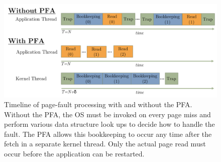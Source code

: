 \begin{figure}[h]
    \centering
    \includegraphics[width=\columnwidth]{figs/bookkeeping_timeline.pdf}
    \caption{Timeline of page-fault processing with and without the PFA.
    Without the PFA, the OS must be invoked on every page miss and perform
    various data structure look ups to decide how to handle the fault. The PFA
    allows this bookkeeping to occur any time after the fetch in a separate kernel
    thread. Only the actual page read must occur before the application can be
    restarted.}
    \label{fig:bookkeeping_timeline}
\end{figure}

